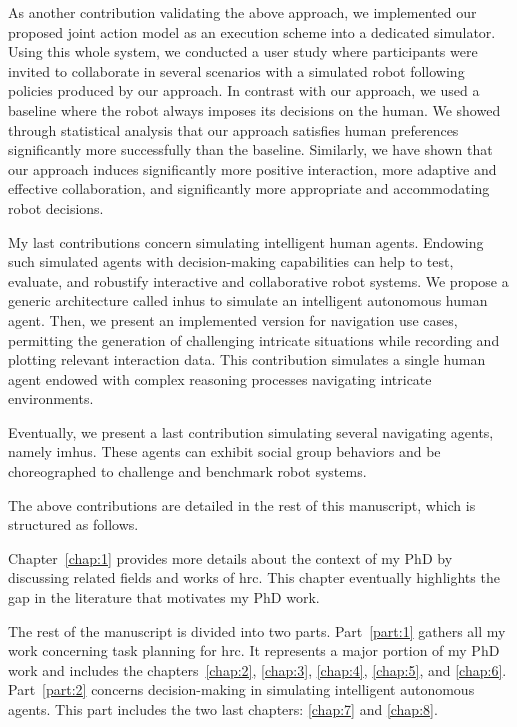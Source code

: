 As another contribution validating the above approach, we implemented our proposed joint action model as an execution scheme into a dedicated simulator. Using this whole system, we conducted a user study where participants were invited to collaborate in several scenarios with a simulated robot following policies produced by our approach. In contrast with our approach, we used a baseline where the robot always imposes its decisions on the human. We showed through statistical analysis that our approach satisfies human preferences significantly more successfully than the baseline. Similarly, we have shown that our approach induces significantly more positive interaction, more adaptive and effective collaboration, and significantly more appropriate and accommodating robot decisions.

My last contributions concern simulating intelligent human agents. Endowing such simulated agents with decision-making capabilities can help to test, evaluate, and robustify interactive and collaborative robot systems. We propose a generic architecture called \acrfull{inhus} to simulate an intelligent autonomous human agent. Then, we present an implemented version for navigation use cases, permitting the generation of challenging intricate situations while recording and plotting relevant interaction data. This contribution simulates a single human agent endowed with complex reasoning processes navigating intricate environments.

Eventually, we present a last contribution simulating several navigating agents, namely \acrfull{imhus}. These agents can exhibit social group behaviors and be choreographed to challenge and benchmark robot systems.



The above contributions are detailed in the rest of this manuscript, which is structured as follows.

Chapter~\ref{chap:1} provides more details about the context of my PhD by discussing related fields and works of \acrshort{hrc}. This chapter eventually highlights the gap in the literature that motivates my PhD work.

The rest of the manuscript is divided into two parts. Part~\ref{part:1} gathers all my work concerning task planning for \acrshort{hrc}. It represents a major portion of my PhD work and includes the chapters~\ref{chap:2}, \ref{chap:3}, \ref{chap:4}, \ref{chap:5}, and \ref{chap:6}. Part~\ref{part:2} concerns decision-making in simulating intelligent autonomous agents. This part includes the two last chapters: \ref{chap:7} and \ref{chap:8}.

